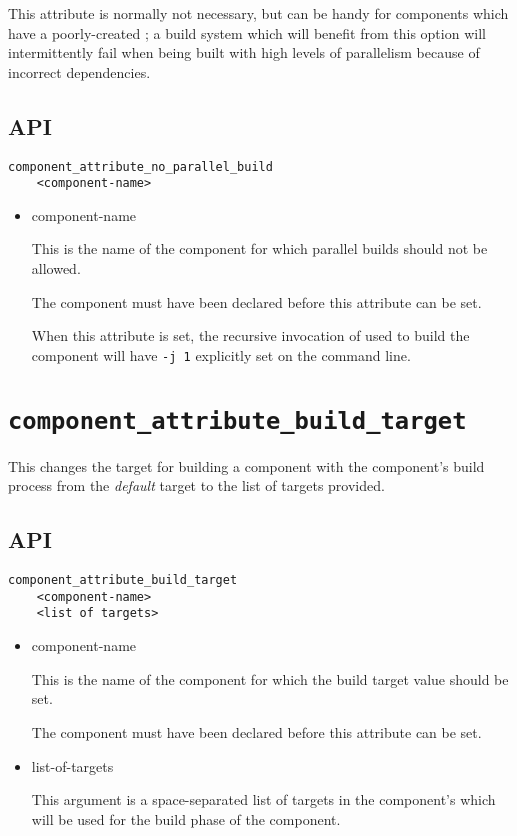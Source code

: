 This attribute is normally not necessary, but can be handy for
components which have a poorly-created \makefile; a build system which
will benefit from this option will intermittently fail when being
built with high levels of parallelism because of incorrect
dependencies.

\subsection{API}

\begin{verbatim}
component_attribute_no_parallel_build
    <component-name>
\end{verbatim}

\begin{itemize}
\item component-name

  This is the name of the component for which parallel builds should
  not be allowed.

  The component must have been declared before this attribute can be
  set.

  When this attribute is set, the recursive invocation of \gnumake
  used to build the component will have \texttt{-j 1} explicitly set
  on the command line.

\end{itemize}

\section{\texttt{component\_attribute\_build\_target}}\label{api:component-attribute-build-target}

This changes the target for building a component with the component's
build process from the \emph{default} \make target to the list of
targets provided.

\subsection{API}

\begin{verbatim}
component_attribute_build_target
    <component-name>
    <list of targets>
\end{verbatim}

\begin{itemize}
\item component-name

  This is the name of the component for which the build target value
  should be set.

  The component must have been declared before this attribute can be
  set.

\item list-of-targets

  This argument is a space-separated list of targets in the
  component's \makefile which will be used for the build phase of the
  component.

\end{itemize}

